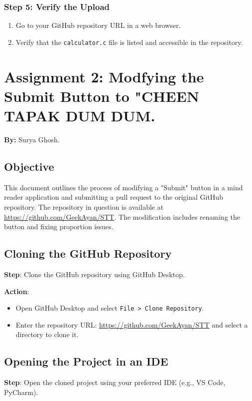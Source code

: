 \documentclass[a4paper,12pt]{article}
\begin{document}
\subsubsection{Step 5: Verify the Upload}
\begin{enumerate}
    \item Go to your GitHub repository URL in a web browser.
    \item Verify that the \texttt{calculator.c} file is listed and accessible in the repository.
\end{enumerate}

\newpage

\section{Assignment 2: Modfying the Submit Button to "CHEEN TAPAK DUM DUM.} 

\textbf{By:} Surya Ghosh.


\subsection{Objective}This document outlines the process of modifying a "Submit" button in a mind reader application and submitting a pull request to the original GitHub repository. The repository in question is available at \url{https://github.com/GeekAyan/STT}. The modification includes renaming the button and fixing proportion issues.


\subsection{Cloning the GitHub Repository}
\textbf{Step}: Clone the GitHub repository using GitHub Desktop.

\textbf{Action}:
\begin{itemize}
    \item Open GitHub Desktop and select \texttt{File > Clone Repository}.
    \item Enter the repository URL: \url{https://github.com/GeekAyan/STT} and select a directory to clone it.
\end{itemize}

\subsection{Opening the Project in an IDE}
\textbf{Step}: Open the cloned project using your preferred IDE (e.g., VS Code, PyCharm).
\end{document}
